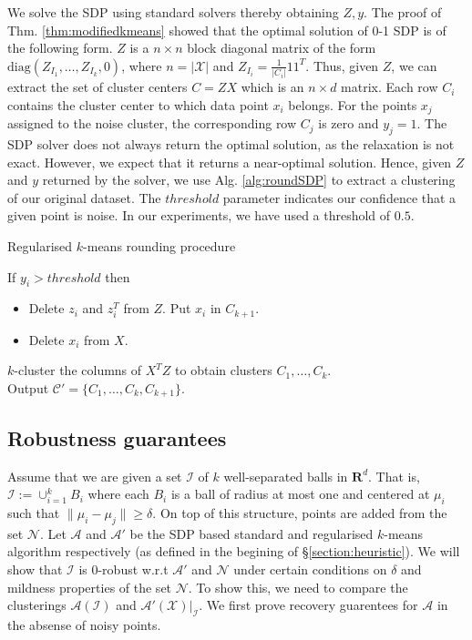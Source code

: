 \documentclass[12pt]{article}
\newcommand{\mc}{\mathcal}
\newcommand{\mb}{\mathbf}
\newcommand{\diag}{\text{diag}}
\begin{document}
We solve the SDP using standard solvers \cite{yang2015sdpnal+} thereby obtaining $Z, y$. 
The proof of Thm. \ref{thm:modifiedkmeans} showed that the optimal solution of 0-1 SDP is of the following form. $Z$ is a $n\times n$ block diagonal matrix of the form $\diag(Z_{I_1}, \ldots, Z_{I_k}, 0)$, where $n = |\mc X|$ and $Z_{I_i} = \frac{1}{|C_i|}11^T$. Thus, given $Z$, we can extract the set of cluster centers $C = ZX$ which is an $n \times d$ matrix. Each row $C_i$ contains the cluster center to which data point $x_i$ belongs. For the points $x_j$ assigned to the noise cluster, the corresponding row $C_j$ is zero and $y_j = 1$. The SDP solver does not always return the optimal solution, as the relaxation is not exact. However, we expect that it returns a near-optimal solution. Hence, given $Z$ and $y$ returned by the solver, we use Alg. \ref{alg:roundSDP} to extract a clustering of our original dataset. The $threshold$ parameter indicates our confidence that a given point is noise. In our experiments, we have used a threshold of $0.5$. 

\SetAlgoNoLine
\LinesNumbered
\begin{algorithm}[t]
\caption{Regularised $k$-means rounding procedure}
\label{alg:roundSDP}
	\Indp\KwIn{ $Z \subset \mathbb{R}^{n\times n}$, $y \subset \mathbb{R}^{n}$, $\mc{X}$, and $threshold \in [0,1]$.}
	\KwOut{$\mc C'$.}
	
	If $y_i > threshold$ then
	\begin{itemize}[nolistsep] 
		\item[] Delete $z_i$ and $z_i^T$ from $Z$. Put $x_i$ in $C_{k+1}$.
		\item[] Delete $x_i$ from $X$.
	\end{itemize}
	$k$-cluster the columns of $X^TZ$ to obtain clusters $C_1, \ldots, C_k$.\\
	Output $\mc C' = \{C_1, \ldots, C_k, C_{k+1}\}$.
\end{algorithm}

\subsection{Robustness guarantees}
\label{subsection:sdpRobust}

Assume that we are given a set $\mc I$ of $k$ well-separated balls in $\mb R^d$. That is, $\mc I := \cup_{i=1}^k B_i$ where each $B_i$ is a ball of radius at most one and centered at $\mu_i$ such that $\|\mu_i - \mu_j\| \ge \delta$. On top of this structure, points are added from the set $\mc N$. Let $\mc A$ and $\mc A'$ be the SDP based standard and regularised $k$-means algorithm respectively (as defined in the begining of \S \ref{section:heuristic}). We will show that $\mc I$ is $0$-robust w.r.t $\mc A'$ and $\mc N$ under certain conditions on $\delta$ and mildness properties of the set $\mc N$. To show this, we need to compare the clusterings $\mc A(\mc I)$ and $\mc A'(\mc X)|_{\mc I}$. We first prove recovery guarentees for $\mc A$ in the absense of noisy points.
\end{document}
